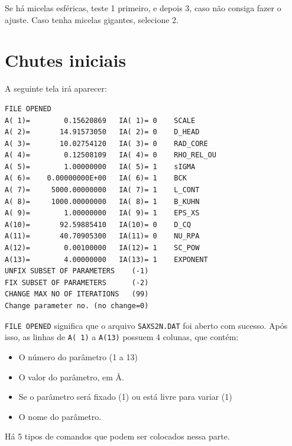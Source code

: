 \begin{apendicesenv}
Se há micelas esféricas, teste 1 primeiro, e depois 3, caso não consiga fazer o ajuste. Caso tenha micelas gigantes, selecione 2.

\section{Chutes iniciais}

A seguinte tela irá aparecer:

\begin{verbatim}
FILE OPENED
A( 1)=        0.15620869   IA( 1)= 0    SCALE
A( 2)=       14.91573050   IA( 2)= 0    D_HEAD
A( 3)=       10.02754120   IA( 3)= 0    RAD_CORE
A( 4)=        0.12508109   IA( 4)= 0    RHO_REL_OU
A( 5)=        1.00000000   IA( 5)= 1    sIGMA
A( 6)=    0.00000000E+00   IA( 6)= 1    BCK
A( 7)=     5000.00000000   IA( 7)= 1    L_CONT
A( 8)=     1000.00000000   IA( 8)= 1    B_KUHN
A( 9)=        1.00000000   IA( 9)= 1    EPS_XS
A(10)=       92.59885410   IA(10)= 0    D_CQ
A(11)=       40.70905300   IA(11)= 0    NU_RPA
A(12)=        0.00100000   IA(12)= 1    SC_POW
A(13)=        4.00000000   IA(13)= 1    EXPONENT
UNFIX SUBSET OF PARAMETERS    (-1)
FIX SUBSET OF PARAMETERS      (-2)
CHANGE MAX NO OF ITERATIONS   (99)
Change parameter no. (no change=0)
\end{verbatim}

\texttt{FILE OPENED} significa que o arquivo \texttt{SAXS2N.DAT} foi aberto com sucesso. Após isso, as linhas de \texttt{A( 1)} a \texttt{A(13)} possuem 4 colunas, que contém:

\begin{itemize}
	\item O número do parâmetro (1 a 13)
	\item O valor do parâmetro, em \AA.
	\item Se o parâmetro será fixado (1) ou está livre para variar (1)
	\item O nome do parâmetro.
\end{itemize}

Há 5 tipos de comandos que podem ser colocados nessa parte.


\end{apendicesenv}
